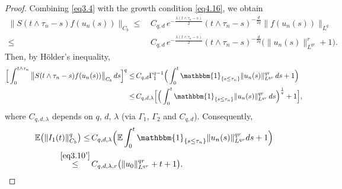 \documentclass[10pt]{article}
\numberwithin{figure}{section}
\numberwithin{equation}{section}
\newcommand{\0}{{\theta}}
\begin{document}
\begin{proof}
Combining \eqref{eq3.4} with the growth condition \eqref{eq4.16}, we obtain
\begin{equation*}
\begin{split}
\big\| S(t \wedge\tau_n - s) f(u_n(s)) \big\|_{C_b}
\le&\, C_{q,d}\, e^{-\frac{\lambda (t \wedge\tau_n - s)}{2}} (t \wedge\tau_n - s)^{-\frac{d}{2q}} \| f(u_n(s)) \|_{L^q} \\
\le&\, C_{q,d}\, e^{-\frac{\lambda (t \wedge\tau_n - s)}{2}} (t \wedge\tau_n - s)^{-\frac{d}{2q}}
        \big( \| u_n(s) \|_{L^{qr}}^{r} + 1 \big).
\end{split}
\end{equation*} 
Then, by H\"older's inequality,
\begin{equation}\label{eq4.2}\begin{split}
      \Big[\int_0^{t \wedge \tau_n} \big\|S(t \wedge \tau_n - s) f(u_n(s)) \big\|_{C_b} \, ds\Big]^{q} 
\le&\, C_{q,d} \Gamma_1^{q-1}
         \Big(\int_0^t \mathbbm{1}_{\{s \le\tau_n\}} \| u_n(s) \|_{L^{qr}}^{qr} \, ds +1 \Big)\\
\le&\, C_{q,d,\lambda} \Big[ \Big( \int_0^t \mathbbm{1}_{\{s \le\tau_n\}} \| u_n(s) \|_{L^{qr}}^{qr} \, ds \Big)^{\frac{1}{q}} + 1 \Big],
\end{split}
\end{equation}
where $C_{q,d,\lambda}$ depends on $q$, $d$, $\lambda$ (via $\Gamma_1$, $\Gamma_2$ and $C_{q,d}$).
Consequently,
\begin{equation*}\begin{split}\label{eq4.10}
\mathbb{E}\big(\| I_1(t) \|_{C_b}^q\big) \le&\, 
          C_{q,d,\lambda} \Big( \mathbb{E}\int_0^t\mathbbm{1}_{\{s \le\tau_n\}} \| u_n(s) \|_{L^{qr}}^{qr} ds + 1 \Big)\\
\stackrel{\eqref{eq3.10'}}{\le}&\, C_{q,d,\lambda,r} \big(\| u_0 \|_{L^{qr}}^{qr} + t + 1 \big).\end{split}
\end{equation*}
\vs


\end{proof}
\end{document}
